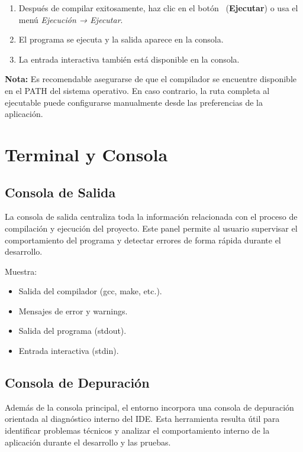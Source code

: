 \documentclass[../../main.tex]{subfiles}
\begin{document}
\begin{enumerate}
    \item Después de compilar exitosamente, haz clic en el botón \faPlay\ (\textbf{Ejecutar}) o usa el menú \textit{Ejecución → Ejecutar}.
    \item El programa se ejecuta y la salida aparece en la consola.
    \item La entrada interactiva también está disponible en la consola.
\end{enumerate}

\textbf{Nota:} Es recomendable asegurarse de que el compilador se encuentre disponible en el PATH del sistema operativo. En caso contrario, la ruta completa al ejecutable puede configurarse manualmente desde las preferencias de la aplicación.

\clearpage

\section{Terminal y Consola}

\subsection{Consola de Salida}

La consola de salida centraliza toda la información relacionada con el proceso de compilación y ejecución del proyecto. Este panel permite al usuario supervisar el comportamiento del programa y detectar errores de forma rápida durante el desarrollo.

Muestra:

\begin{itemize}
    \item Salida del compilador (gcc, make, etc.).
    \item Mensajes de error y warnings.
    \item Salida del programa (stdout).
    \item Entrada interactiva (stdin).
\end{itemize}

\subsection{Consola de Depuración}

Además de la consola principal, el entorno incorpora una consola de depuración orientada al diagnóstico interno del IDE. Esta herramienta resulta útil para identificar problemas técnicos y analizar el comportamiento interno de la aplicación durante el desarrollo y las pruebas.
\end{document}
